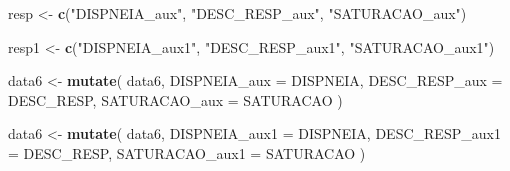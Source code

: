 \documentclass[
]{article}
\newenvironment{Shaded}{\begin{snugshade}}{\end{snugshade}}
\newcommand{\DataTypeTok}[1]{\textcolor[rgb]{0.13,0.29,0.53}{#1}}
\newcommand{\KeywordTok}[1]{\textcolor[rgb]{0.13,0.29,0.53}{\textbf{#1}}}
\newcommand{\NormalTok}[1]{#1}
\newcommand{\StringTok}[1]{\textcolor[rgb]{0.31,0.60,0.02}{#1}}
\begin{document}
\begin{Shaded}
\begin{Highlighting}[]
\NormalTok{resp <-}\StringTok{  }\KeywordTok{c}\NormalTok{(}\StringTok{"DISPNEIA_aux"}\NormalTok{, }\StringTok{"DESC_RESP_aux"}\NormalTok{, }\StringTok{"SATURACAO_aux"}\NormalTok{)}

\NormalTok{resp1 <-}\StringTok{  }\KeywordTok{c}\NormalTok{(}\StringTok{"DISPNEIA_aux1"}\NormalTok{, }\StringTok{"DESC_RESP_aux1"}\NormalTok{, }\StringTok{"SATURACAO_aux1"}\NormalTok{)}

\NormalTok{data6 <-}
\StringTok{  }\KeywordTok{mutate}\NormalTok{(}
\NormalTok{    data6,}
    \DataTypeTok{DISPNEIA_aux =}\NormalTok{ DISPNEIA,}
    \DataTypeTok{DESC_RESP_aux =}\NormalTok{ DESC_RESP,}
    \DataTypeTok{SATURACAO_aux =}\NormalTok{ SATURACAO}
\NormalTok{  )}

\NormalTok{data6 <-}
\StringTok{  }\KeywordTok{mutate}\NormalTok{(}
\NormalTok{    data6,}
    \DataTypeTok{DISPNEIA_aux1 =}\NormalTok{ DISPNEIA,}
    \DataTypeTok{DESC_RESP_aux1 =}\NormalTok{ DESC_RESP,}
    \DataTypeTok{SATURACAO_aux1 =}\NormalTok{ SATURACAO}
\NormalTok{  )}


\end{Highlighting}
\end{Shaded}
\end{document}
